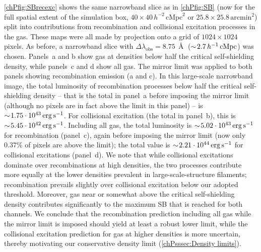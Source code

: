 \cref{chPfig:SBrecexc} shows the same narrowband slice as in \cref{chPfig:SB} (now for the full spatial extent of the simulation box, $40 \times 40 \, h^{-2} \, \mathrm{cMpc}^2$ or $25.8 \times 25.8 \, \mathrm{arcmin}^2$) split into contributions from recombination and collisional excitation processes in the gas. These maps were all made by projection onto a grid of $1024 \times 1024$ pixels. As before, a narrowband slice with $\Delta \lambda_\text{obs} = 8.75 \, \Angstrom$ ($\sim \! 2.7 \, h^{-1} \, \mathrm{cMpc}$) was chosen. Panels~a and b show gas at densities below half the critical self-shielding density, while panels~c and d show all gas. The mirror limit was applied to both panels showing recombination emission (a and c). In this large-scale narrowband image, the total luminosity of recombination processes below half the critical self-shielding density -- that is the total in panel~a before imposing the mirror limit (although no pixels are in fact above the limit in this panel) -- is $\sim \! 1.75 \cdot 10^{43} \, \mathrm{erg \, s^{-1}}$. For collisional excitation (the total in panel~b), this is $\sim \! 5.45 \cdot 10^{42} \, \mathrm{erg \, s^{-1}}$. Including all gas, the total luminosity is $\sim \! 5.02 \cdot 10^{43} \, \mathrm{erg \, s^{-1}}$ for recombination (panel~c), again before imposing the mirror limit (now only $0.37\%$ of pixels are above the limit); the total value is $\sim \! 2.21 \cdot 10^{44} \, \mathrm{erg \, s^{-1}}$ for collisional excitations (panel~d). We note that while collisional excitations dominate over recombinations at high densities, the two processes contribute more equally at the lower densities prevalent in large-scale-structure filaments; recombination prevails slightly over collisional excitation below our adopted threshold. Moreover, gas near or somewhat above the critical self-shielding density contributes significantly to the maximum SB that is reached for both channels. We conclude that the recombination prediction including all gas while the mirror limit is imposed should yield at least a robust lower limit, while the collisional excitation prediction for gas at higher densities is more uncertain, thereby motivating our conservative density limit (\cref{chPsssec:Density limits}).
